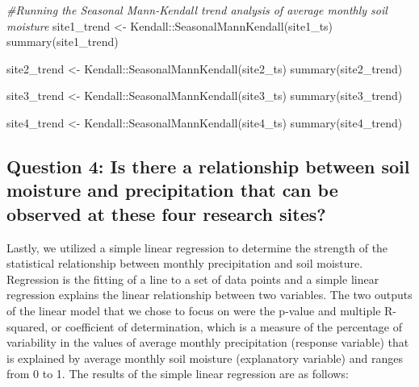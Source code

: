 \documentclass[
  12pt,
]{article}
\newenvironment{Shaded}{\begin{snugshade}}{\end{snugshade}}
\newcommand{\CommentTok}[1]{\textcolor[rgb]{0.56,0.35,0.01}{\textit{#1}}}
\newcommand{\FunctionTok}[1]{\textcolor[rgb]{0.00,0.00,0.00}{#1}}
\newcommand{\NormalTok}[1]{#1}
\newcommand{\OtherTok}[1]{\textcolor[rgb]{0.56,0.35,0.01}{#1}}
\newcommand{\SpecialCharTok}[1]{\textcolor[rgb]{0.00,0.00,0.00}{#1}}
\begin{document}
\begin{Shaded}
\begin{Highlighting}[]
\CommentTok{\#Running the Seasonal Mann{-}Kendall trend analysis of average monthly soil moisture}
\NormalTok{site1\_trend }\OtherTok{\textless{}{-}}\NormalTok{ Kendall}\SpecialCharTok{::}\FunctionTok{SeasonalMannKendall}\NormalTok{(site1\_ts)}
\FunctionTok{summary}\NormalTok{(site1\_trend)}

\NormalTok{site2\_trend }\OtherTok{\textless{}{-}}\NormalTok{ Kendall}\SpecialCharTok{::}\FunctionTok{SeasonalMannKendall}\NormalTok{(site2\_ts)}
\FunctionTok{summary}\NormalTok{(site2\_trend)}

\NormalTok{site3\_trend }\OtherTok{\textless{}{-}}\NormalTok{ Kendall}\SpecialCharTok{::}\FunctionTok{SeasonalMannKendall}\NormalTok{(site3\_ts)}
\FunctionTok{summary}\NormalTok{(site3\_trend)}

\NormalTok{site4\_trend }\OtherTok{\textless{}{-}}\NormalTok{ Kendall}\SpecialCharTok{::}\FunctionTok{SeasonalMannKendall}\NormalTok{(site4\_ts)}
\FunctionTok{summary}\NormalTok{(site4\_trend)}
\end{Highlighting}
\end{Shaded}

\hypertarget{question-4-is-there-a-relationship-between-soil-moisture-and-precipitation-that-can-be-observed-at-these-four-research-sites}{%
\subsection{Question 4: Is there a relationship between soil moisture
and precipitation that can be observed at these four research
sites?}\label{question-4-is-there-a-relationship-between-soil-moisture-and-precipitation-that-can-be-observed-at-these-four-research-sites}}

Lastly, we utilized a simple linear regression to determine the strength
of the statistical relationship between monthly precipitation and soil
moisture. Regression is the fitting of a line to a set of data points
and a simple linear regression explains the linear relationship between
two variables. The two outputs of the linear model that we chose to
focus on were the p-value and multiple R-squared, or coefficient of
determination, which is a measure of the percentage of variability in
the values of average monthly precipitation (response variable) that is
explained by average monthly soil moisture (explanatory variable) and
ranges from 0 to 1. The results of the simple linear regression are as
follows:
\end{document}
